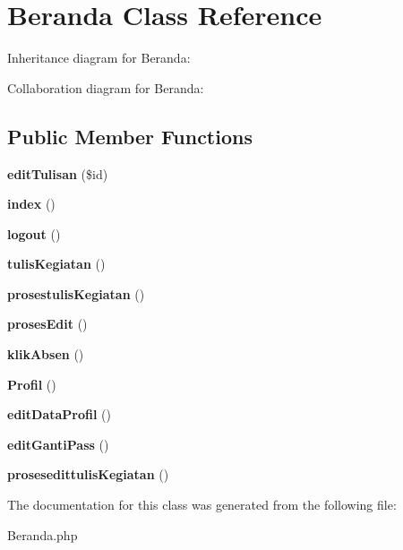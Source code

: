 \hypertarget{class_beranda}{}\section{Beranda Class Reference}
\label{class_beranda}


Inheritance diagram for Beranda\+:


Collaboration diagram for Beranda\+:
\subsection*{Public Member Functions}
\begin{DoxyCompactItemize}
\item 
\mbox{\label{class_beranda_a7c4eb4b4a9a71c44618cc1a468f5b648}} 
{\bfseries edit\+Tulisan} (\$id)
\item 
\mbox{\label{class_beranda_a149eb92716c1084a935e04a8d95f7347}} 
{\bfseries index} ()
\item 
\mbox{\label{class_beranda_a082405d89acd6835c3a7c7a08a7adbab}} 
{\bfseries logout} ()
\item 
\mbox{\label{class_beranda_af8aea016744864450395c066439f1de5}} 
{\bfseries tulis\+Kegiatan} ()
\item 
\mbox{\label{class_beranda_a7c69805724ac9795167001ab93a66128}} 
{\bfseries prosestulis\+Kegiatan} ()
\item 
\mbox{\label{class_beranda_ad084ab330543dbb5668b91abb636d07f}} 
{\bfseries proses\+Edit} ()
\item 
\mbox{\label{class_beranda_a73587b8ae3724a4e9848db4cd532b577}} 
{\bfseries klik\+Absen} ()
\item 
\mbox{\label{class_beranda_afd629002b15a1886ba3c0f3b62bdd657}} 
{\bfseries Profil} ()
\item 
\mbox{\label{class_beranda_ae46555382827c0b83b72751f00c456b5}} 
{\bfseries edit\+Data\+Profil} ()
\item 
\mbox{\label{class_beranda_ac8b2132413a7d5ba442d615314d1e0ee}} 
{\bfseries edit\+Ganti\+Pass} ()
\item 
\mbox{\label{class_beranda_a140a5c310b041762a831d118f6075525}} 
{\bfseries prosesedittulis\+Kegiatan} ()
\end{DoxyCompactItemize}


The documentation for this class was generated from the following file\+:\begin{DoxyCompactItemize}
\item 
Beranda.\+php\end{DoxyCompactItemize}

